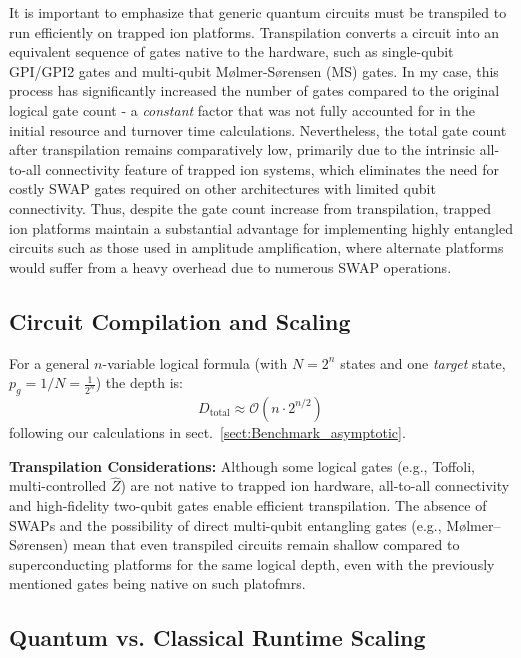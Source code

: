 \documentclass[encoding=utf8,british]{tumphthesis}
\begin{document}
    It is important to emphasize that generic quantum circuits must be transpiled to run efficiently on trapped ion platforms. Transpilation converts a circuit 
    into an equivalent sequence of gates native to the hardware, such as single-qubit GPI/GPI2 gates and multi-qubit Mølmer-Sørensen (MS) gates. In my case, 
    this process has significantly increased the number of gates compared to the original logical gate count - a \textit{constant} factor that was not fully accounted for in the 
    initial resource and turnover time calculations. Nevertheless, the total gate count after transpilation remains comparatively low, primarily due to the 
    intrinsic all-to-all connectivity feature of trapped ion systems, which eliminates the need for costly SWAP gates required on other architectures with 
    limited qubit connectivity. Thus, despite the gate count increase from transpilation, trapped ion platforms maintain a substantial advantage for 
    implementing highly entangled circuits such as those used in amplitude amplification, where alternate platforms would suffer from a heavy overhead due 
    to numerous SWAP operations.

\subsection{Circuit Compilation and Scaling}

For a general $n$-variable logical formula (with $N = 2^n$ states and one \textit{target} state, $p_g = 1/N = \frac{1}{2^n}$) the depth is:
\begin{equation*}
    D_{\text{total}} \approx \mathcal{O}(n \cdot 2^{n/2})
\end{equation*}
following our calculations in sect.~\ref{sect:Benchmark_asymptotic}.

\noindent
\textbf{Transpilation Considerations:}  
Although some logical gates (e.g., Toffoli, multi-controlled $\hat{Z}$) are not native to trapped ion hardware, all-to-all connectivity and 
high-fidelity two-qubit gates enable efficient transpilation. The absence of SWAPs and the possibility of direct multi-qubit entangling gates 
(e.g., Mølmer–Sørensen) mean that even transpiled circuits remain shallow compared to superconducting platforms for the same logical depth,
even with the previously mentioned gates being native on such platofmrs.

\subsection{Quantum vs. Classical Runtime Scaling}
\end{document}
